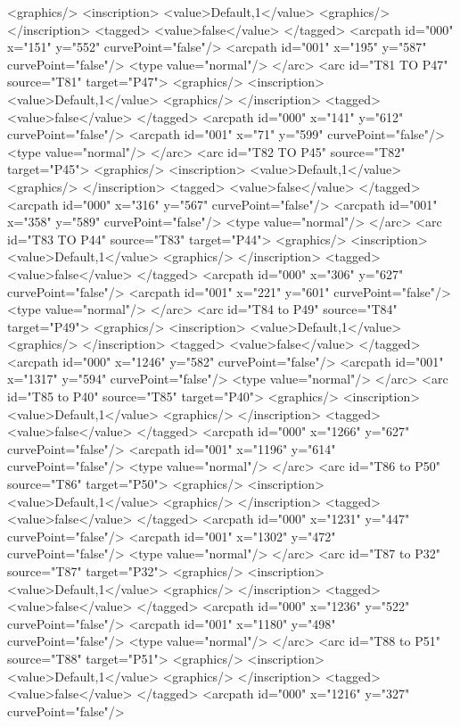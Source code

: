 <graphics/>
<inscription>
<value>Default,1</value>
<graphics/>
</inscription>
<tagged>
<value>false</value>
</tagged>
<arcpath id="000" x="151" y="552" curvePoint="false"/>
<arcpath id="001" x="195" y="587" curvePoint="false"/>
<type value="normal"/>
</arc>
<arc id="T81 TO P47" source="T81" target="P47">
<graphics/>
<inscription>
<value>Default,1</value>
<graphics/>
</inscription>
<tagged>
<value>false</value>
</tagged>
<arcpath id="000" x="141" y="612" curvePoint="false"/>
<arcpath id="001" x="71" y="599" curvePoint="false"/>
<type value="normal"/>
</arc>
<arc id="T82 TO P45" source="T82" target="P45">
<graphics/>
<inscription>
<value>Default,1</value>
<graphics/>
</inscription>
<tagged>
<value>false</value>
</tagged>
<arcpath id="000" x="316" y="567" curvePoint="false"/>
<arcpath id="001" x="358" y="589" curvePoint="false"/>
<type value="normal"/>
</arc>
<arc id="T83 TO P44" source="T83" target="P44">
<graphics/>
<inscription>
<value>Default,1</value>
<graphics/>
</inscription>
<tagged>
<value>false</value>
</tagged>
<arcpath id="000" x="306" y="627" curvePoint="false"/>
<arcpath id="001" x="221" y="601" curvePoint="false"/>
<type value="normal"/>
</arc>
<arc id="T84 to P49" source="T84" target="P49">
<graphics/>
<inscription>
<value>Default,1</value>
<graphics/>
</inscription>
<tagged>
<value>false</value>
</tagged>
<arcpath id="000" x="1246" y="582" curvePoint="false"/>
<arcpath id="001" x="1317" y="594" curvePoint="false"/>
<type value="normal"/>
</arc>
<arc id="T85 to P40" source="T85" target="P40">
<graphics/>
<inscription>
<value>Default,1</value>
<graphics/>
</inscription>
<tagged>
<value>false</value>
</tagged>
<arcpath id="000" x="1266" y="627" curvePoint="false"/>
<arcpath id="001" x="1196" y="614" curvePoint="false"/>
<type value="normal"/>
</arc>
<arc id="T86 to P50" source="T86" target="P50">
<graphics/>
<inscription>
<value>Default,1</value>
<graphics/>
</inscription>
<tagged>
<value>false</value>
</tagged>
<arcpath id="000" x="1231" y="447" curvePoint="false"/>
<arcpath id="001" x="1302" y="472" curvePoint="false"/>
<type value="normal"/>
</arc>
<arc id="T87 to P32" source="T87" target="P32">
<graphics/>
<inscription>
<value>Default,1</value>
<graphics/>
</inscription>
<tagged>
<value>false</value>
</tagged>
<arcpath id="000" x="1236" y="522" curvePoint="false"/>
<arcpath id="001" x="1180" y="498" curvePoint="false"/>
<type value="normal"/>
</arc>
<arc id="T88 to P51" source="T88" target="P51">
<graphics/>
<inscription>
<value>Default,1</value>
<graphics/>
</inscription>
<tagged>
<value>false</value>
</tagged>
<arcpath id="000" x="1216" y="327" curvePoint="false"/>
